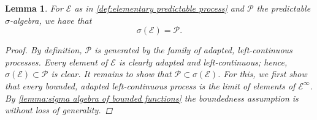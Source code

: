 \documentclass[11pt,a4paper,twoside,openany]{report}
\theoremstyle{plain} %
\newtheorem{lemma}[lemma]{Lemma}
\theoremstyle{definition} %
\theoremstyle{remark} %
\begin{document}
\begin{lemma}\label{lemma:elementary processes generated predictable sigma algebra}
    For \(\mathcal{E}\) as in \cref{def:elementary predictable process} and \(\mathcal{P}\) the predictable \(\sigma\)-algebra, we have that 
    \begin{equation}
        \sigma(\mathcal{E})=\mathcal{P}.
    \end{equation}
    \begin{proof}
        By definition, \(\mathcal{P}\) is generated by the family of adapted, left-continuous processes. Every element of \(\mathcal{E}\) is clearly adapted and left-continuous; hence, \(\sigma(\mathcal{E})\subset\mathcal{P}\) is clear. It remains to show that \(\mathcal{P}\subset\sigma(\mathcal{E})\). For this, we first show that every bounded, adapted left-continuous process is the limit of elements of \(\mathcal{E}^{\infty}\). By \cref{lemma:sigma algebra of bounded functions} the boundedness assumption is without loss of generality. 
        

\end{proof}
\end{lemma}
\end{document}
